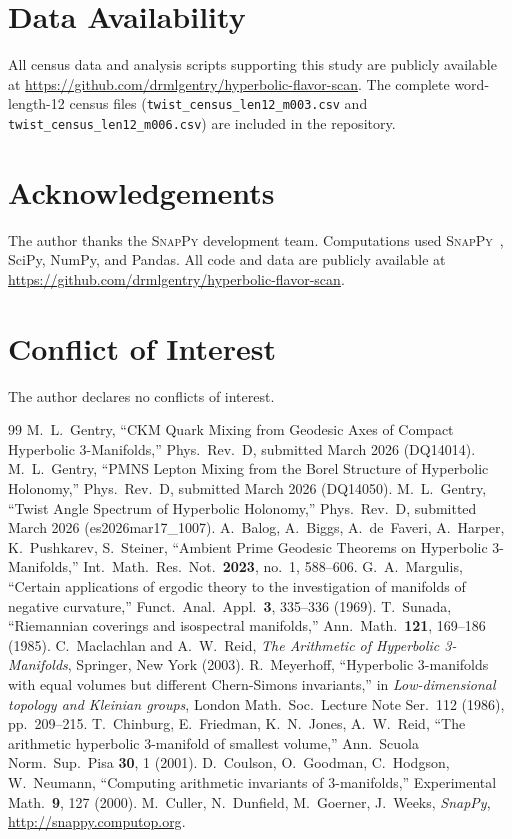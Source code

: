 \documentclass[12pt,a4paper]{article}
\begin{document}
\section*{Data Availability}
All census data and analysis scripts supporting this study are publicly
available at \url{https://github.com/drmlgentry/hyperbolic-flavor-scan}.
The complete word-length-12 census files (\texttt{twist\_census\_len12\_m003.csv}
and \texttt{twist\_census\_len12\_m006.csv}) are included in the repository.

\section*{Acknowledgements}
The author thanks the \textsc{SnapPy} development team.
Computations used \textsc{SnapPy}~\cite{SnapPy}, SciPy, NumPy, and Pandas.
All code and data are publicly available at
\url{https://github.com/drmlgentry/hyperbolic-flavor-scan}.

\section*{Conflict of Interest}
The author declares no conflicts of interest.

\begin{thebibliography}{99}
  M.~L.~Gentry,
  ``CKM Quark Mixing from Geodesic Axes of Compact Hyperbolic 3-Manifolds,''
  Phys.\ Rev.\ D, submitted March 2026 (DQ14014).
  M.~L.~Gentry,
  ``PMNS Lepton Mixing from the Borel Structure of Hyperbolic Holonomy,''
  Phys.\ Rev.\ D, submitted March 2026 (DQ14050).
  M.~L.~Gentry,
  ``Twist Angle Spectrum of Hyperbolic Holonomy,''
  Phys.\ Rev.\ D, submitted March 2026 (es2026mar17\_1007).
  A.~Balog, A.~Biggs, A.~de~Faveri, A.~Harper, K.~Pushkarev, S.~Steiner,
  ``Ambient Prime Geodesic Theorems on Hyperbolic 3-Manifolds,''
  Int.\ Math.\ Res.\ Not.\ \textbf{2023}, no.~1, 588--606.
  G.~A.~Margulis,
  ``Certain applications of ergodic theory to the investigation of manifolds
  of negative curvature,'' Funct.\ Anal.\ Appl.\ \textbf{3}, 335--336 (1969).
  T.~Sunada,
  ``Riemannian coverings and isospectral manifolds,''
  Ann.\ Math.\ \textbf{121}, 169--186 (1985).
  C.~Maclachlan and A.~W.~Reid,
  \textit{The Arithmetic of Hyperbolic 3-Manifolds},
  Springer, New York (2003).
  R.~Meyerhoff,
  ``Hyperbolic 3-manifolds with equal volumes but different Chern-Simons
  invariants,''
  in \textit{Low-dimensional topology and Kleinian groups},
  London Math.\ Soc.\ Lecture Note Ser.~112 (1986), pp.~209--215.
  T.~Chinburg, E.~Friedman, K.~N.~Jones, A.~W.~Reid,
  ``The arithmetic hyperbolic 3-manifold of smallest volume,''
  Ann.\ Scuola Norm.\ Sup.\ Pisa \textbf{30}, 1 (2001).
  D.~Coulson, O.~Goodman, C.~Hodgson, W.~Neumann,
  ``Computing arithmetic invariants of 3-manifolds,''
  Experimental Math.\ \textbf{9}, 127 (2000).
  M.~Culler, N.~Dunfield, M.~Goerner, J.~Weeks,
  \textit{SnapPy}, \url{http://snappy.computop.org}.
\end{thebibliography}
\end{document}
